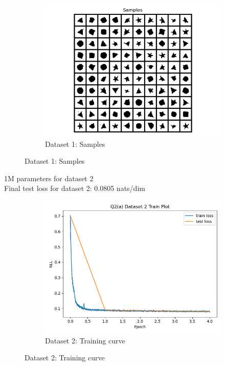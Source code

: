\documentclass{article}
\begin{document}
\begin{enumerate}[(a)]
\begin{figure}[H]
\begin{subfigure}{0.45\textwidth}
        \includegraphics[width=\textwidth]{figures/q2_a_dset1_samples.png}
        \caption{Dataset 1: Samples}
    \end{subfigure}
\end{figure}
1M parameters for dataset 2 \\
Final test loss for dataset 2: 0.0805 nats/dim
\begin{figure}[H]
    \centering
    \begin{subfigure}{0.45\textwidth}
        \centering
        \includegraphics[width=\textwidth]{figures/q2_a_dset2_train_plot.png}
        \caption{Dataset 2: Training curve}
    \end{subfigure}
    \hspace{0.2in}

\end{figure}
\end{enumerate}
\end{document}
